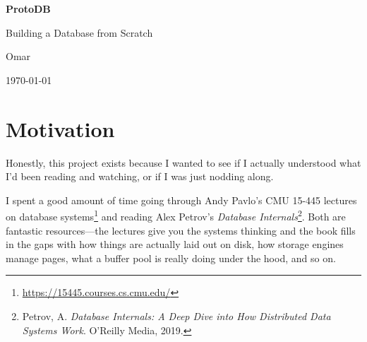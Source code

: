 \documentclass[12pt, a4paper]{report}
\begin{document}
\begin{titlepage}
    \centering
    \vspace*{3cm}

    {\Huge\bfseries\textcolor{proto-dark}{ProtoDB}\par}
    \vspace{0.5cm}
    {\Large\textcolor{proto-gray}{Building a Database from Scratch}\par}

    \vspace{2cm}


    \vfill

    {\large Omar\par}
    \vspace{0.3cm}
    {\textcolor{proto-gray}{\today}\par}
\end{titlepage}

\tableofcontents
\newpage


\chapter{Motivation}

Honestly, this project exists because I wanted to see if I actually understood
what I'd been reading and watching, or if I was just nodding along.

I spent a good amount of time going through Andy Pavlo's CMU 15-445 lectures
on database systems\footnote{\url{https://15445.courses.cs.cmu.edu/}} and
reading Alex Petrov's \textit{Database Internals}\footnote{Petrov, A.
\textit{Database Internals: A Deep Dive into How Distributed Data Systems
Work}. O'Reilly Media, 2019.}. Both are fantastic resources---the lectures
give you the systems thinking and the book fills in the gaps with how things
are actually laid out on disk, how storage engines manage pages, what a buffer
pool is really doing under the hood, and so on.
\end{document}
